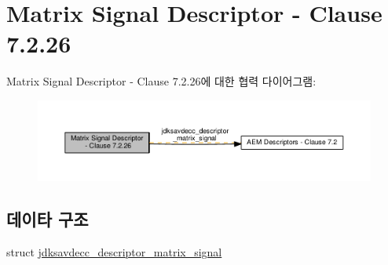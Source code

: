 \hypertarget{group__descriptor__matrix__signal}{}\section{Matrix Signal Descriptor -\/ Clause 7.2.26}
\label{group__descriptor__matrix__signal}
Matrix Signal Descriptor -\/ Clause 7.2.26에 대한 협력 다이어그램\+:
\nopagebreak
\begin{figure}[H]
\begin{center}
\leavevmode
\includegraphics[width=350pt]{group__descriptor__matrix__signal}
\end{center}
\end{figure}
\subsection*{데이타 구조}
\begin{DoxyCompactItemize}
\item 
struct \hyperlink{structjdksavdecc__descriptor__matrix__signal}{jdksavdecc\+\_\+descriptor\+\_\+matrix\+\_\+signal}
\end{DoxyCompactItemize}
